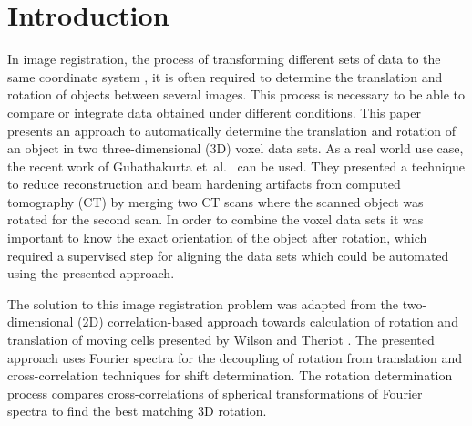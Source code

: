 \section{Introduction}

In image registration, the process of transforming different sets of data to the same coordinate system \cite{wiki_imageregistration}, it is often required to determine the translation and rotation of objects between several images. 
This process is necessary to be able to compare or integrate data obtained under different conditions.
This paper presents an approach to automatically determine the translation and rotation of an object in two three-dimensional (3D) voxel data sets. 
As a real world use case, the recent work of Guhathakurta et~al.\ \cite{Guhathakurta} can be used. 
They presented a technique to reduce reconstruction and beam hardening artifacts from computed tomography (CT) by merging two CT scans where the scanned object was rotated for the second scan. 
In order to combine the voxel data sets it was important to know the exact orientation of the object after rotation, which required a supervised step for aligning the data sets which could be automated using the presented approach.

The solution to this image registration problem was adapted from the two-dimensional (2D) correlation-based approach towards calculation of rotation and translation of moving cells presented by Wilson and Theriot \cite{WilsonT06}.
The presented approach uses Fourier spectra for the decoupling of rotation from translation and cross-correlation techniques for shift determination.
The rotation determination process compares cross-correlations of spherical transformations of Fourier spectra to find the best matching 3D rotation.